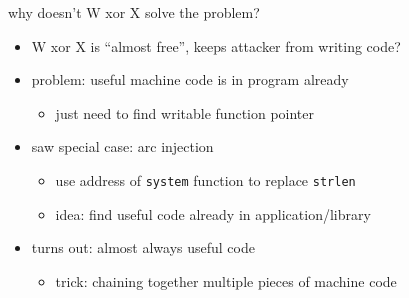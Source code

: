 \begin{frame}{why doesn't W xor X solve the problem?}
    \begin{itemize}
    \item W xor X is ``almost free'', keeps attacker from writing code?
    \item problem: useful machine code is in program already
        \begin{itemize}
        \item just need to find writable function pointer
        \end{itemize}
    \item saw special case: arc injection
        \begin{itemize}
        \item use address of \texttt{system} function to replace \texttt{strlen}
        \item idea: find useful code already in application/library
        \end{itemize}
    \item turns out: almost always useful code
        \begin{itemize}
        \item trick: chaining together multiple pieces of machine code
        \end{itemize}
    \end{itemize}
\end{frame}
